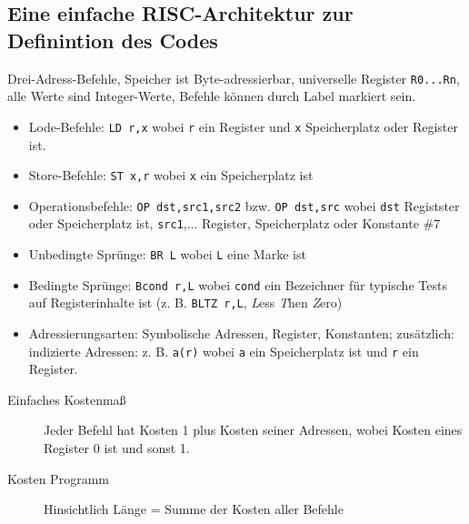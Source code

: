 \subsection{Eine einfache RISC-Architektur zur Definintion des Codes}
Drei-Adress-Befehle, Speicher ist Byte-adressierbar, universelle Register \texttt{R0...Rn}, alle Werte sind Integer-Werte, Befehle können durch Label markiert sein.
\begin{itemize}
 \item Lode-Befehle:       \texttt{LD r,x}           wobei \texttt{r} ein Register und \texttt{x} Speicherplatz oder Register ist.
 \item Store-Befehle:      \texttt{ST x,r}           wobei \texttt{x} ein Speicherplatz ist 
 \item Operationsbefehle:  \texttt{OP dst,src1,src2} bzw. \texttt{OP dst,src} wobei \texttt{dst} Registster oder Speicherplatz ist, \texttt{src1},... Register, Speicherplatz oder Konstante \#7
 \item Unbedingte Sprünge: \texttt{BR L}             wobei \texttt{L} eine Marke ist
 \item Bedingte Sprünge:   \texttt{Bcond r,L}        wobei \texttt{cond} ein Bezeichner für typische Tests auf Registerinhalte ist (z. B. \texttt{BLTZ r,L}, \emph{L}ess \emph{T}hen \emph{Z}ero)
 \item Adressierungsarten: Symbolische Adressen, Register, Konstanten; zusätzlich: indizierte Adressen: z. B. \texttt{a(r)} wobei \texttt{a} ein Speicherplatz ist und \texttt{r} ein Register.
\end{itemize}
\begin{description}
 \item[Einfaches Kostenmaß] Jeder Befehl hat Kosten 1 plus Kosten seiner Adressen, wobei Kosten eines Register 0 ist und sonst 1.
 \item[Kosten Programm] Hinsichtlich Länge = Summe der Kosten aller Befehle
\end{description}